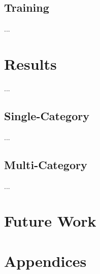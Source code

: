 \documentclass[11pt,a4paper]{article}
\begin{document}
\subsection{Training}

...


\section{Results}

...


\subsection{Single-Category}

...


\subsection{Multi-Category}

...

\section{Future Work}




\appendix

\section{Appendices}
\label{sec:appendix}
\end{document}
